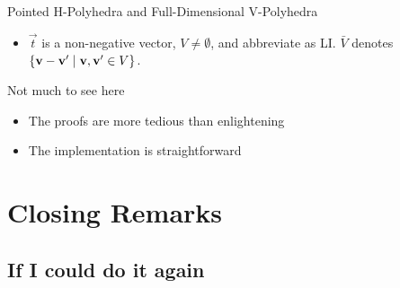 \documentclass{beamer}
\begin{document}
\begin{frame}{Pointed H-Polyhedra and Full-Dimensional V-Polyhedra}
\begin{itemize}
  \item $\vec{t}$ is a non-negative vector, $V \neq \emptyset$, and abbreviate {\LI} as LI. $\bar V$ denotes $\{\mathbf{v}-\mathbf{v}'\;|\;\mathbf{v},\mathbf{v}'\in V\}$.\\

  \renewcommand{\arraystretch}{1.3}
\end{itemize}
\end{frame}

\begin{frame}{Not much to see here}
\begin{itemize}
  \item The proofs are more tedious than enlightening
  \item The implementation is straightforward
\end{itemize}
\end{frame}


\section{Closing Remarks}

\subsection{If I could do it again}

\end{document}
